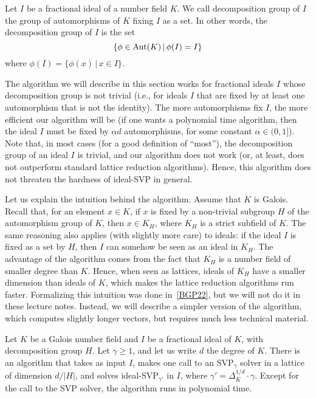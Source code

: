 \begin{definition}
Let $I$ be a fractional ideal of a number field $K$. We call decomposition group of $I$ the group of automorphisms of $K$ fixing $I$ as a set. In other words, the decomposition group of $I$ is the set
\[ \{ \phi \in \operatorname{Aut}(K) \,|\, \phi(I) = I \}\]
where $\phi(I) = \{ \phi(x)\,|\, x \in I\}$.
\end{definition}

The algorithm we will describe in this section works for fractional ideals $I$ whose decomposition group is not trivial (i.e., for ideals $I$ that are fixed by at least one automorphism that is not the identity). The more automorphisms fix $I$, the more efficient our algorithm will be (if one wants a polynomial time algorithm, then the ideal $I$ must be fixed by $\alpha d$ automorphisms, for some constant $\alpha \in (0,1]$). Note that, in most cases (for a good definition of ``most''), the decomposition group of an ideal $I$ is trivial, and our algorithm does not work (or, at least, does not outperform standard lattice reduction algorithms). Hence, this algorithm does not threaten the hardness of ideal-SVP in general.

Let us explain the intuition behind the algorithm. Assume that $K$ is Galois. Recall that, for an element $x \in K$, if $x$ is fixed by a non-trivial subgroup $H$ of the automorphism group of $K$, then $x \in K_H$, where $K_H$ is a strict subfield of $K$. The same reasoning also applies (with slightly more care) to ideals: if the ideal $I$ is fixed as a set by $H$, then $I$ can somehow be seen as an ideal in $K_H$. The advantage of the algorithm comes from the fact that $K_H$ is a number field of smaller degree than $K$. Hence, when seen as lattices, ideals of $K_H$ have a smaller dimension than ideals of $K$, which makes the lattice reduction algorithms run faster.
Formalizing this intuition was done in~\ref{BGP22}, but we will not do it in these lecture notes. Instead, we will describe a simpler version of the algorithm, which computes slightly longer vectors, but requires much less technical material.

\begin{theorem}
\label{thm:attack-ideal-SVP}
Let $K$ be a Galois number field and $I$ be a fractional ideal of $K$, with decomposition group $H$. Let $\gamma \geq 1$, and let us write $d$ the degree of $K$. There is an algorithm that takes as input $I$, makes one call to an SVP$_\gamma$ solver in a lattice of dimension $d/|H|$, and solves ideal-SVP$_{\gamma'}$ in $I$, where $\gamma' = \Delta_K^{1/d} \cdot \gamma$.
Except for the call to the SVP solver, the algorithm runs in polynomial time.
\end{theorem}

